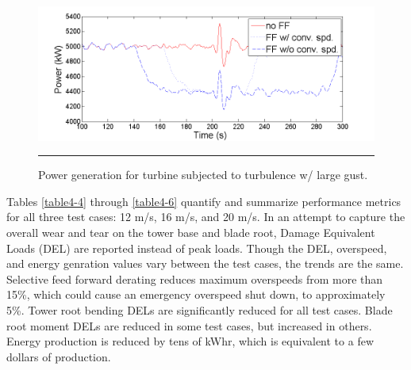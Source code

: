 \begin{figure}[htbp]
	\centering
		\includegraphics[trim = {1cm 0 2cm 0}, clip, width = \linewidth]{Figures/ch4Figures/fig4-31.png}
		\rule{35em}{0.5pt}
	\caption{Power generation for turbine subjected to turbulence w/ large gust.}
	\label{fig4-31}
\end{figure}

Tables \ref{table4-4} through \ref{table4-6} quantify and summarize performance metrics for all three test cases: 12 m/s, 16 m/s, and 20 m/s. In an attempt to capture the overall wear and tear on the tower base and blade root, Damage Equivalent Loads (DEL) are reported instead of peak loads. Though the DEL, overspeed, and energy genration values vary between the test cases, the trends are the same. Selective feed forward derating reduces maximum overspeeds from more than 15\%, which could cause an emergency overspeed shut down, to approximately 5\%. Tower root bending DELs are significantly reduced for all test cases. Blade root moment DELs are reduced in some test cases, but increased in others. Energy production is reduced by tens of kWhr, which is equivalent to a few dollars of production.


